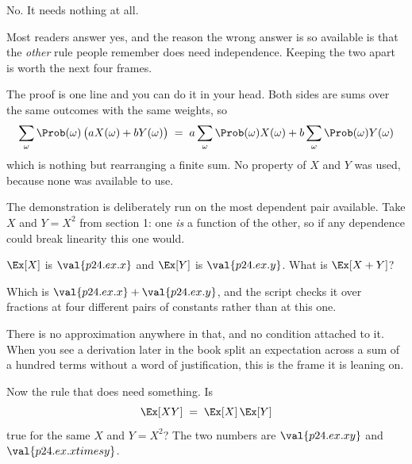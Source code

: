 \begin{fr}
\begin{ansblock}
No. It needs nothing at all.
\end{ansblock}

Most readers answer yes, and the reason the wrong answer is so available is
that the \emph{other} rule people remember does need independence. Keeping the
two apart is worth the next four frames.

The proof is one line and you can do it in your head. Both sides are sums over
the same outcomes with the same weights, so
\[ \sum_{\omega} \Prob(\omega)\,\bigl(aX(\omega) + bY(\omega)\bigr)
   \;=\; a\sum_{\omega} \Prob(\omega)X(\omega)
       + b\sum_{\omega} \Prob(\omega)Y(\omega) \]
which is nothing but rearranging a finite sum. No property of $X$ and $Y$ was
used, because none was available to use.
\end{fr}

\begin{fr}
The demonstration is deliberately run on the most dependent pair available.
Take $X$ and $Y = X^{2}$ from section 1: one \emph{is} a function of the other,
so if any dependence could break linearity this one would.

$\Ex[X]$ is $\val{p24.ex.x}$ and $\Ex[Y]$ is $\val{p24.ex.y}$. What is
$\Ex[X + Y]$?
\dotline
\nextframe
\end{fr}

\begin{fr}

Which is $\val{p24.ex.x} + \val{p24.ex.y}$, and the script checks it over
fractions at four different pairs of constants rather than at this one.

There is no approximation anywhere in that, and no condition attached to it.
When you see a derivation later in the book split an expectation across a sum
of a hundred terms without a word of justification, this is the frame it is
leaning on.
\end{fr}

\begin{fr}
Now the rule that does need something. Is
\[ \Ex[XY] \;=\; \Ex[X]\,\Ex[Y] \]
true for the same $X$ and $Y = X^{2}$? The two numbers are
$\val{p24.ex.xy}$ and $\val{p24.ex.xtimesy}$.
\dotline
\nextframe
\end{fr}

